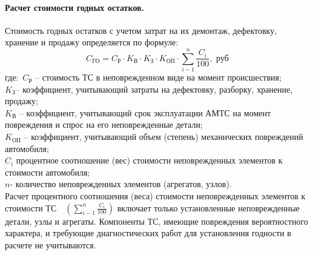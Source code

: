 \paragraph*{Расчет стоимости годных остатков.}
 Стоимость годных остатков с учетом затрат на их демонтаж, дефектовку, хранение и продажу определяется по формуле:
 \begin{equation}\label{go}
C_{\text{ГО}}= C_{\text{Р}} \cdot K_{\text{В}}\cdot K_{\text{З}}\cdot K_{\text{ОП}} \cdot  \sum\limits_{i-1}^{n}\frac{C_i}{100}, \, \, \text{руб} 
\end{equation}
\noindent где: \,$ C_{\text{Р}} $ -- стоимость ТС в неповрежденном виде на момент происшествия;\\
$ K_{\text{З}} $-- коэффициент, учитывающий затраты на дефектовку, разборку, хранение, продажу;\\
$ K_{\text{В}} $ -- коэффициент, учитывающий срок эксплуатации АМТС на момент повреждения и спрос на его неповрежденные детали;\\
$ K_{\text{ОП}} $ -- коэффициент, учитывающий объем (степень) механических повреждений автомобиля;\\
$ C_i $ процентное соотношение (вес) стоимости неповрежденных элементов к стоимости автомобиля;\\
$ n  $- количество неповрежденных элементов (агрегатов, узлов).\\

Расчет процентного соотношения (веса) стоимости неповрежденных элементов к стоимости ТС   \,\,
   $  \left( \sum\limits_{i-1}^{n}\frac{C_i}{100} \right)  $  
включает только установленные неповрежденные детали, узлы и агрегаты. Компоненты ТС, имеющие повреждения  вероятностного характера, и требующие диагностических работ для установления годности в расчете не учитываются. 
 
